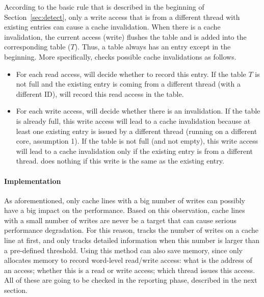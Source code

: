 According to the basic rule that is described in the beginning of Section~\ref{sec:detect}, only a write access that is from a different thread with existing entries can cause a cache invalidation. When there is a cache invalidation, the current access (write) flushes the table and is added into the corresponding table ($T$). Thus, a table always has an entry except in the beginning. More specifically, \cheetah{} checks possible cache invalidations as follows.
\begin{itemize}
\item
For each read access, \cheetah{} will decide whether to record this entry. If the table $T$ is not full and the existing entry is coming from a different thread (with a different ID), \cheetah{} will record this read access in the table.
  
  \item
  For each write access, \cheetah{} will decide whether there is an invalidation. If the table is already full, this write access will lead to a cache invalidation because at least one existing entry is issued by a different thread (running on a different core, assumption 1). If the table is not full (and not empty), this write access will lead to a cache invalidation only if the existing entry is from a different thread. \cheetah{} does nothing if this write is the same as the existing entry. 
  
\end{itemize}
     

\paragraph{Implementation} 
As aforementioned, only cache lines with a big number of writes can possibly have a big impact on the performance. Based on this observation, cache lines with a small number of writes are never be a target that can cause serious performance degradation. For this reason, \Cheetah{} tracks the number of writes on a cache line at first, and only tracks detailed information when this number is larger than a pre-defined threshold. Using this method can also save memory, since \cheetah{} only allocates memory to record word-level read/write access: what is the address of an access; whether this is a read or write access; which thread issues this access. All of these are going to be checked in the reporting phase, described in the next section. 

